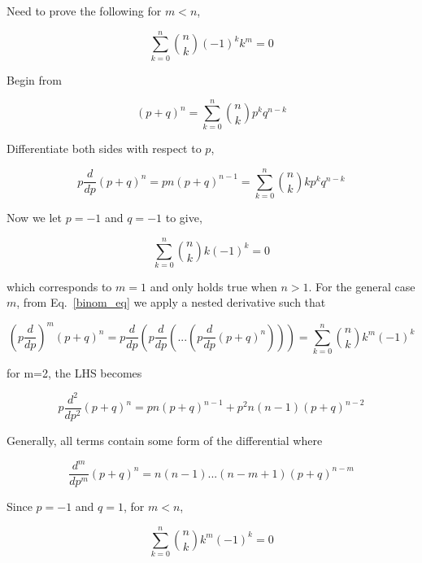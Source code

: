 \documentclass[a4paper,12pt,titlepage]{report}
\renewcommand{\eqref}[1]{Eq.~\ref{#1}}
\begin{document}
Need to prove the following for $m < n$,

\begin{equation}
\sum_{k=0}^{n}\binom {n}{k}\left(-1\right)^{k}k^{m} =0
\end{equation}

Begin from 

\begin{equation}
\left(p+q\right)^{n}=\sum_{k=0}^{n}\binom {n}{k}p^{k}q^{n-k}
\label{binom_eq}
\end{equation}

Differentiate both sides with respect to $p$,

\begin{equation}
p\frac{d}{dp}\left(p+q\right)^{n}=pn\left(p+q\right)^{n-1}=\sum_{k=0}^{n}\binom {n}{k}kp^{k}q^{n-k}
\end{equation}

Now we let $p=-1$ and $q=-1$ to give,

\begin{equation}
\sum_{k=0}^{n}\binom {n}{k}k\left(-1\right)^{k}=0
\end{equation}

which corresponds to $m=1$ and only holds true when $n > 1$. For the general case $m$, from \eqref{binom_eq} we apply a nested derivative such that

\begin{equation}
\left(p\frac{d}{dp}\right)^{m}\left(p+q\right)^{n}=p\frac{d}{dp}\left(p\frac{d}{dp}\left(...\left(p\frac{d}{dp}\left(p+q\right)^{n} \right)\right)\right)=\sum_{k=0}^{n}\binom {n}{k}k^{m}\left(-1\right)^{k}
\end{equation}

for m=2, the LHS becomes

\begin{equation}
p\frac{d^{2}}{dp^2}\left(p+q\right)^{n}=pn\left(p+q\right)^{n-1} + p^{2}n\left(n-1\right)\left(p+q\right)^{n-2}
\end{equation}

Generally, all terms contain some form of the differential where

\begin{equation}
\frac{d^{m}}{dp^{m}}\left(p+q\right)^{n} = n\left(n-1\right)...\left(n-m+1\right)\left(p+q\right)^{n-m}
\end{equation}

Since $p=-1$ and $q=1$, for $m < n$,

\begin{equation}
\sum_{k=0}^{n}\binom {n}{k}k^{m}\left(-1\right)^{k}=0
\end{equation}
\end{document}
